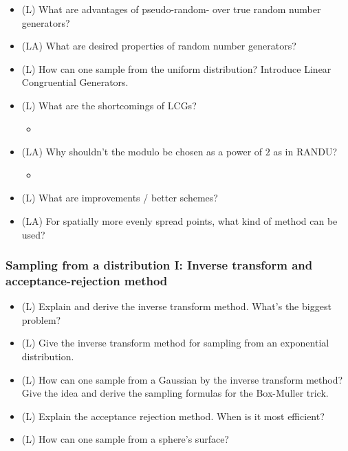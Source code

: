 \begin{itemize}
    \item (L) What are advantages of pseudo-random- over true random number generators?
    \item (LA) What are desired properties of random number generators?
    \item (L) How can one sample from the uniform distribution? Introduce Linear Congruential Generators.
    \item (L) What are the shortcomings of LCGs?
    \begin{itemize}
        \item {}
    \end{itemize}
    \item (LA) Why shouldn't the modulo be chosen as a power of $2$ as in RANDU?
    \begin{itemize}
        \item {}
    \end{itemize}
    \item (L) What are improvements / better schemes?
    \item (LA) For spatially more evenly spread points, what kind of method can be used?
\end{itemize}

\subsubsection*{Sampling from a distribution I: Inverse transform and acceptance-rejection method}
\begin{itemize}
    \item (L) Explain and derive the inverse transform method. What's the biggest problem?
    \item (L) Give the inverse transform method for sampling from an exponential distribution.
    \item (L) How can one sample from a Gaussian by the inverse transform method? Give the idea and derive the sampling formulas for the Box-Muller trick.
    \item (L) Explain the acceptance rejection method. When is it most efficient?
    \item (L) How can one sample from a sphere's surface?
\end{itemize}

